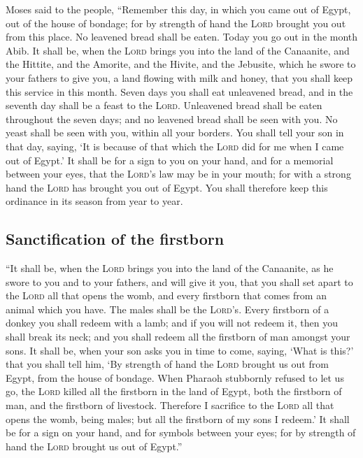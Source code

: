  Moses said to the people, ``Remember this day, in which
you came out of Egypt, out of the house of bondage; for by strength of
hand the \textsc{Lord} brought you out from this place. No leavened
bread shall be eaten.  Today you go out in the month Abib.
 It shall be, when the \textsc{Lord} brings you into the
land of the Canaanite, and the Hittite, and the Amorite, and the Hivite,
and the Jebusite, which he swore to your fathers to give you, a land
flowing with milk and honey, that you shall keep this service in this
month.  Seven days you shall eat unleavened bread, and in
the seventh day shall be a feast to the \textsc{Lord}. 
Unleavened bread shall be eaten throughout the seven days; and no
leavened bread shall be seen with you. No yeast shall be seen with you,
within all your borders.  You shall tell your son in that
day, saying, `It is because of that which the \textsc{Lord} did for me
when I came out of Egypt.'  It shall be for a sign to you
on your hand, and for a memorial between your eyes, that the
\textsc{Lord}'s law may be in your mouth; for with a strong hand the
\textsc{Lord} has brought you out of Egypt.  You shall
therefore keep this ordinance in its season from year to year.

\hypertarget{sanctification-of-the-firstborn}{%
\subsection{Sanctification of the
firstborn}\label{sanctification-of-the-firstborn}}

 ``It shall be, when the \textsc{Lord} brings you into
the land of the Canaanite, as he swore to you and to your fathers, and
will give it you,  that you shall set apart to the
\textsc{Lord} all that opens the womb, and every firstborn that comes
from an animal which you have. The males shall be the \textsc{Lord}'s.
 Every firstborn of a donkey you shall redeem with a
lamb; and if you will not redeem it, then you shall break its neck; and
you shall redeem all the firstborn of man amongst your sons.
 It shall be, when your son asks you in time to come,
saying, `What is this?' that you shall tell him, `By strength of hand
the \textsc{Lord} brought us out from Egypt, from the house of bondage.
 When Pharaoh stubbornly refused to let us go, the
\textsc{Lord} killed all the firstborn in the land of Egypt, both the
firstborn of man, and the firstborn of livestock. Therefore I sacrifice
to the \textsc{Lord} all that opens the womb, being males; but all the
firstborn of my sons I redeem.'  It shall be for a sign
on your hand, and for symbols between your eyes; for by strength of hand
the \textsc{Lord} brought us out of Egypt.''

